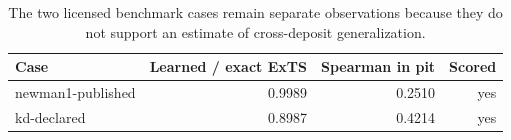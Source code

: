 \begin{table}[htbp]\centering
\caption{The two licensed benchmark cases remain separate observations because they do not support an estimate of cross-deposit generalization.}\label{tab:real-holdout}
\begin{tabular}{lrrr}\toprule Case & Learned / exact ExTS & Spearman in pit & Scored \\ \midrule
newman1-published & 0.9989 & 0.2510 & yes \\
kd-declared & 0.8987 & 0.4214 & yes \\
\bottomrule\end{tabular}\end{table}
